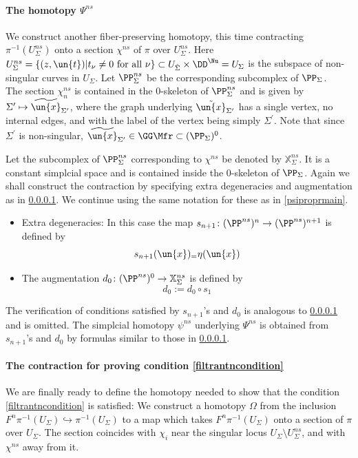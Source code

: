 \documentclass[a4paper,10pt]{amsart}
\begin{document}
\paragraph{\textbf{The homotopy ${\Psi}^{ns}$}}\label{psihtpy} We construct another fiber-preserving homotopy, this time contracting $\pi^{-1}(U^{ns}_{\Sigma})$ onto a section ${\chi}^{ns}$ of $\pi$ over $U^{ns}_{\Sigma}$. Here $U^{ns}_{\Sigma} = \{(z,\un{t})| t_{\nu} \neq 0 \mbox{ for all } \nu\} \subset U_{\hat{\Sigma}} \times \DD^{\Nu} = U_{\Sigma}$ is the subspace of non-singular curves in $U_{\Sigma}$. Let $\PP^{ns}_{\Sigma}$ be the corresponding subcomplex of $\PP_{\Sigma}$.\\
The section ${\chi}_n^{ns}$ is contained in the $0$-skeleton of $\PP_{\Sigma}^{ns}$ and is given by $\Sigma^\prime \mapsto \widetilde{\un{x}}_{\Sigma^\prime}$, where the graph underlying $\tilde{\un{x}}_{\Sigma^\prime}$ has a single vertex, no internal edges, and with the label of the vertex being simply $\Sigma^\prime$. Note that since $\Sigma^\prime$ is non-singular, $\widetilde{\un{x}}_{\Sigma^\prime}\in \GG \Mfr \subset (\PP_{\Sigma})^0$.


Let the subcomplex of  ${\PP}^{ns}_{\Sigma}$ corresponding to $\chi^{ns}$ be denoted by $\mathbb{X}^{ns}_{\Sigma}$. It is a constant simplcial space and is contained inside the $0$-skeleton of $\PP_{\Sigma}$.
Again we shall construct the contraction by specifying extra degeneracies and augmentation as in \ref{psihtpy}. We continue using the same notation for these as in \ref{psiproprmain}.
	\begin{itemize}
		\item Extra degeneracies: In this case the map $s_{n+1} \colon (\PP^{ns})^n \to  (\PP^{ns})^{n+1}$ is defined by 
		\[ s_{n+1}(\un{x}) _= \eta(\un{x}) \]
		\item The augmentation $d_0 \colon  (\PP^{ns})^0 \to \mathbb{X}^{ns}_{\Sigma}$ is defined by 
		\[ d_0 := d_0 \circ s_1 \]
	\end{itemize}
The verification of conditions satisfied by $s_{n+1}$'s and $d_0$ is analogous to \ref{psihtpy} and is omitted. The simplcial homotopy ${\psi}^{ns}$ underlying ${\Psi}^{ns}$ is obtained from $s_{n+1}$'s and $d_0$ by formulas similar to those in \ref{psihtpy}.

\paragraph{\textbf{The contraction for proving condition \eqref{filtrantncondition}}}\label{mthm1finalparag}
We are finally ready to define the homotopy needed to show that the condition \eqref{filtrantncondition} is satisfied:	We construct a homotopy $\Omega$ from the inclusion $F^n\pi^{-1}(U_{\Sigma}) \hookrightarrow \pi^{-1}(U_{\Sigma})$ to a map which takes $F^n\pi^{-1}(U_{\Sigma})$ onto a section of $\pi$ over $U_{\Sigma}$. The section coincides with $\chi_i$ near the singular locus $U_{\Sigma} \setminus U^{ns}_{\Sigma}$, and with $\chi^{ns}$ away from it.
\end{document}
